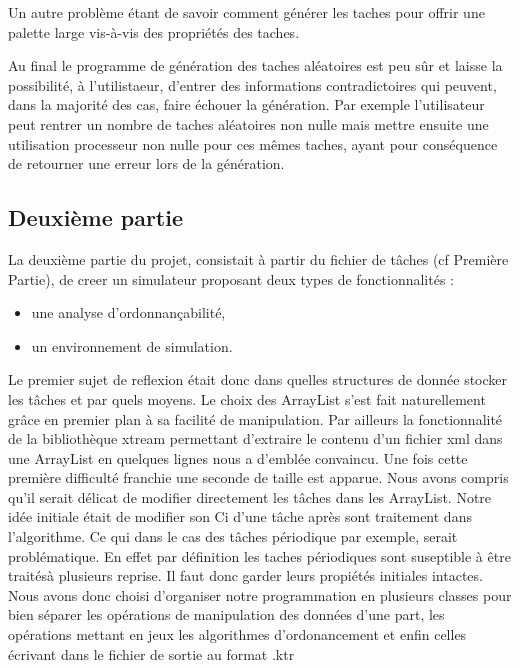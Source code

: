 Un autre problème étant de savoir comment générer les taches pour offrir une palette large vis-à-vis des propriétés des taches.

Au final le programme de génération des taches aléatoires est peu sûr et laisse la possibilité, à l'utilistaeur, d'entrer des informations contradictoires qui peuvent, dans la majorité des cas, faire échouer la génération.
Par exemple l'utilisateur peut rentrer un nombre de taches aléatoires non nulle mais mettre ensuite une utilisation processeur non nulle pour ces mêmes taches, ayant pour conséquence de retourner une erreur lors de la génération.

\subsection{Deuxième partie}
La deuxième partie du projet, consistait à partir du fichier de tâches (cf Première Partie), de creer un simulateur proposant  deux types de fonctionnalités :
\begin{itemize}
\item
une analyse d'ordonnançabilité,
\item
un environnement de simulation.
\end{itemize}
Le premier sujet de reflexion était donc dans quelles structures de donnée stocker les tâches et par quels moyens. Le choix des ArrayList s'est fait naturellement grâce en premier plan à sa facilité de manipulation. Par ailleurs la fonctionnalité de la bibliothèque xtream permettant d'extraire le contenu d'un fichier xml dans une ArrayList en quelques lignes nous a d'emblée convaincu. Une fois cette première difficulté franchie une seconde de taille est apparue. Nous avons compris qu'il serait délicat de modifier directement les tâches dans les ArrayList. Notre idée initiale était de  modifier son Ci d'une  tâche après sont traitement dans l'algorithme. Ce qui dans le cas des tâches périodique par exemple, serait problématique. En effet par définition les taches périodiques  sont suseptible à être traitésà plusieurs reprise. Il faut donc garder leurs propiétés initiales intactes. Nous avons donc choisi d'organiser notre programmation en plusieurs classes pour bien séparer les opérations de manipulation des données d'une part, les opérations mettant en jeux les algorithmes d'ordonancement et enfin celles écrivant dans le fichier de sortie au format .ktr

